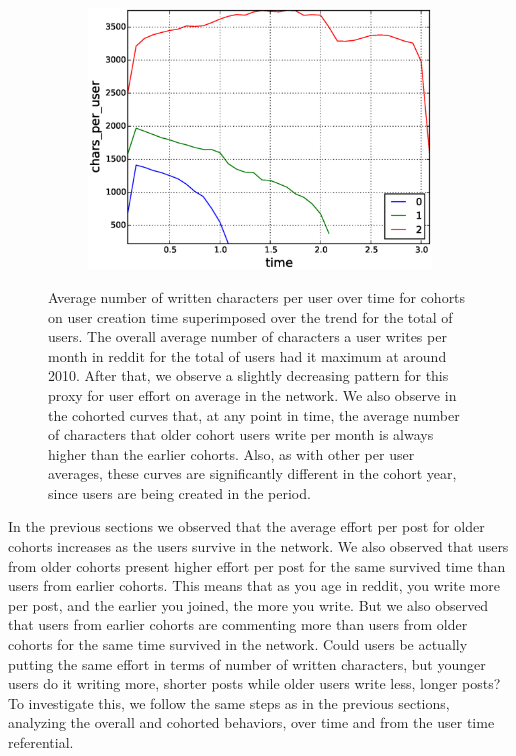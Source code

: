 \begin{figure}[!tb]
\begin{subfigure}{.3\textwidth}\includegraphics[scale=0.285]{./images/avr_comment_length_user_for_surviving_year_for_2012.eps}\caption{}\end{subfigure}
\caption{Average number of written characters per user over time for cohorts on user creation time superimposed over the trend for the total of users. The overall average number of characters a user writes per month in reddit for the total of users had it maximum at around 2010. After that, we observe a slightly decreasing pattern for this proxy for user effort on average in the network. We also observe in the cohorted curves that, at any point in time, the average number of characters that older cohort users write per month is always higher than the earlier cohorts. Also, as with other per user averages, these curves are significantly different in the cohort year, since users are being created in the period.}
\label{fig:avr_comment_size_user_over_time_cohorts}
\end{figure}

In the previous sections we observed that the average effort per post for older cohorts increases as the users survive in the network. We also observed that users from older cohorts present higher effort per post for the same survived time than users from earlier cohorts. This means that as you age in reddit, you write more per post, and the earlier you joined, the more you write. But we also observed that users from earlier cohorts are commenting more than users from older cohorts for the same time survived in the network. Could users be actually putting the same effort in terms of number of written characters, but younger users do it writing more, shorter posts while older users write less, longer posts? To investigate this, we follow the same steps as in the previous sections, analyzing the overall and cohorted behaviors, over time and from the user time referential.

